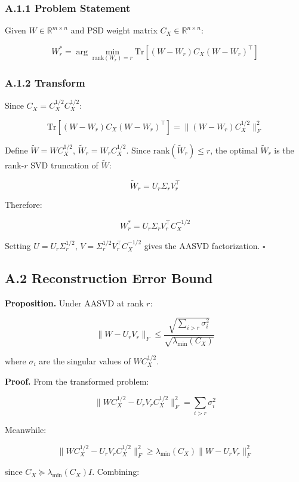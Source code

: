 \subsubsection{A.1.1 Problem Statement}

Given $W \in \mathbb{R}^{m \times n}$ and PSD weight matrix $C_X \in \mathbb{R}^{n \times n}$:

\[
W_r^* = \arg\min_{\text{rank}(W_r) = r} \mathrm{Tr}\!\left[(W - W_r) C_X (W - W_r)^\top\right]
\tag{A.1}
\]

\subsubsection{A.1.2 Transform}

Since $C_X = C_X^{1/2} C_X^{1/2}$:

\[
\mathrm{Tr}[(W - W_r) C_X (W - W_r)^\top] = \|(W - W_r) C_X^{1/2}\|_F^2
\tag{A.2}
\]

Define $\tilde{W} = W C_X^{1/2}$, $\tilde{W}_r = W_r C_X^{1/2}$. Since 
$\text{rank}(\tilde{W}_r) \leq r$, the optimal $\tilde{W}_r$ is the rank-$r$ 
SVD truncation of $\tilde{W}$:

\[
\tilde{W}_r = U_r \Sigma_r V_r^\top
\tag{A.3}
\]

Therefore:

\[
W_r^* = U_r \Sigma_r V_r^\top C_X^{-1/2}
\tag{A.4}
\]

Setting $U = U_r \Sigma_r^{1/2}$, $V = \Sigma_r^{1/2} V_r^\top C_X^{-1/2}$ 
gives the AASVD factorization. $\square$

\subsection{A.2 Reconstruction Error Bound}

\textbf{Proposition.} Under AASVD at rank $r$:

\[
\|W - U_r V_r\|_F \leq \frac{\sqrt{\sum_{i > r} \sigma_i^2}}{\sqrt{\lambda_\text{min}(C_X)}}
\tag{A.5}
\]

where $\sigma_i$ are the singular values of $W C_X^{1/2}$.

\textbf{Proof.} From the transformed problem:

\[
\|W C_X^{1/2} - U_r V_r C_X^{1/2}\|_F^2 = \sum_{i > r} \sigma_i^2
\tag{A.6}
\]

Meanwhile:

\[
\|W C_X^{1/2} - U_r V_r C_X^{1/2}\|_F^2 \geq \lambda_\text{min}(C_X) \|W - U_r V_r\|_F^2
\tag{A.7}
\]

since $C_X \succeq \lambda_\text{min}(C_X) I$. Combining:

